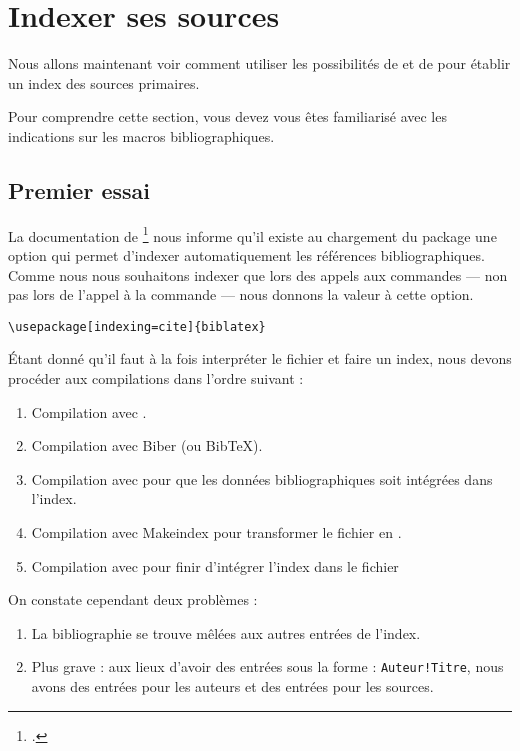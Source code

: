 \section{Indexer ses sources}


Nous allons maintenant voir comment utiliser les possibilités de  et de  pour établir un index des sources primaires.

Pour comprendre cette section, vous devez vous êtes familiarisé avec les indications sur les macros bibliographiques.



\subsection{Premier essai}

La documentation de \footcite{biblatex_options} nous informe qu'il existe  au chargement du package une option  qui permet d'indexer automatiquement les références bibliographiques. Comme nous nous souhaitons indexer que lors des appels aux commandes   ---  non pas lors de l'appel à la commande  --- nous donnons la valeur  à cette option. 

\begin{verbatim}
\usepackage[indexing=cite]{biblatex}
\end{verbatim}

Étant donné qu'il faut à la fois interpréter le fichier  et faire un index, nous devons procéder aux compilations dans l'ordre suivant :

\begin{enumerate}
\item Compilation avec \XeLaTeX.
\item Compilation avec Biber (ou BibTeX).
\item Compilation avec \XeLaTeX pour que les données bibliographiques soit intégrées dans l'index.
\item Compilation avec Makeindex pour transformer le fichier  en .
\item Compilation avec \XeLaTeX pour finir d'intégrer l'index dans le fichier 
\end{enumerate}

On constate cependant deux problèmes : 
\begin{enumerate}
\item La bibliographie se trouve mêlées aux autres entrées de l'index.
\item Plus grave : aux lieux d'avoir des entrées sous la forme : \verb|Auteur!Titre|, nous avons des entrées pour les auteurs et des entrées pour les sources.
\end{enumerate}

